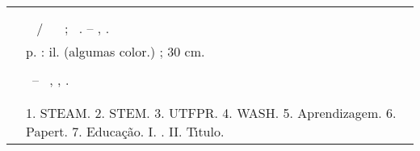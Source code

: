 %
\begin{fichacatalografica}
	\hspace{-1.4cm}
	\imprimirnotaautorizacao \\ \\
	\vspace*{\fill}					%
\begin{center}					%
  \imprimirnotabib \\
  \begin{table}[Htb]
	\scriptsize
	\centering	
	\begin{tabular}{|p{0.9cm} p{8.7cm}|}
		\hline
	      & \\
		  &	  \imprimirautorficha     \\
		
		 \imprimircutter & 
							\hspace{0.4cm}\imprimirtitulo~  / ~\imprimirautor~ ;  ~\imprimirorientadorcorpoficha. -- 	\imprimirlocal, \imprimirdata.   \\
		
		  &  %
		
			\hspace{0.4cm}\pageref{LastPage} p. : il. (algumas color.) ; 30 cm.\\ 
		  & \\
		  & 
		    \hspace{0.4cm}\imprimirnotaficha ~--~ 
						  \imprimirunidademin, 
						  \imprimiruniversidademin, 
		                  \imprimirdata. \\ 
		  & \\                 
		  & \\ 
		  & \hspace{0.4cm}1. STEAM. 2. STEM. 3. UTFPR. 4. WASH. 5. Aprendizagem. 6. Papert. 7. Educa\c{c}\~ao. I. \imprimirorientadorficha. 
		   II. T\'{\i}tulo. \\
	

\end{tabular}
\end{table}
\end{center}
\end{fichacatalografica}
